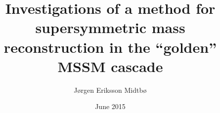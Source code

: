 \documentclass[twoside,english]{uiofysmaster}
\author{J\o rgen Eriksson Midtb\o}
\title{Investigations of a method for supersymmetric mass reconstruction in the ``golden'' MSSM cascade}
\date{June 2015}
\begin{document}
\begin{titlepage}
\maketitle
\end{titlepage}
\end{document}
